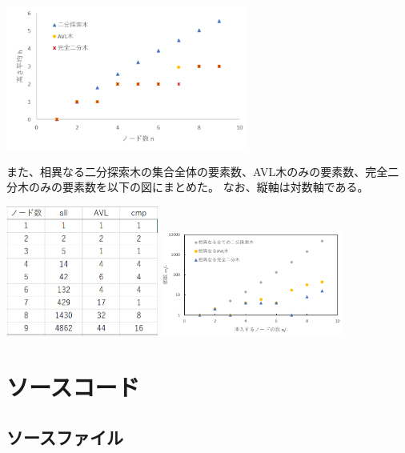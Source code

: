 \documentclass{ltjsarticle}
\begin{document}
\begin{center}
\includegraphics[width=8cm]{hikaku_g.png}
\end{center}

また、相異なる二分探索木の集合全体の要素数、AVL木のみの要素数、完全二分木のみの要素数を以下の図にまとめた。
なお、縦軸は対数軸である。

\begin{center}
\includegraphics[width=5cm]{num_t.png}
\includegraphics[width=6cm]{num_g.png}
\end{center}

\newpage

\section{ソースコード}

\subsection{ソースファイル}






\end{document}
